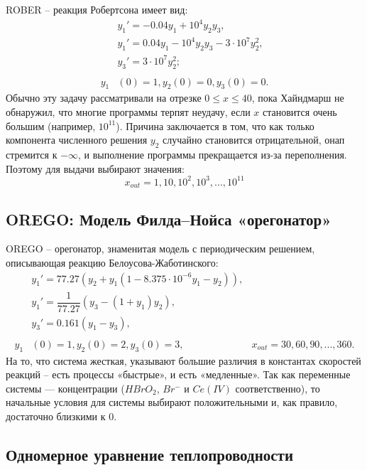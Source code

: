 \documentclass[a4paper,14pt]{extreport}
\begin{document}
  ROBER -- реакция Робертсона имеет вид:
   \begin{equation}
	\begin{aligned}
	\label{rober}
	&y_1' = -0.04y_1+10^4 y_2y_3,\\
	&y_1' = 0.04y_1-10^4y_2y_3 -3 \cdot 10^7y_2^2,\\
	&y_3' = 3\cdot10^7y_2^2;\\
	\\
	y_1&(0)=1, y_2(0) = 0, y_3(0) = 0.
	\end{aligned}
	\end{equation}
Обычно эту задачу рассматривали на отрезке $0 \leq x \leq 40$, пока Хайндмарш не обнаружил, что многие программы терпят неудачу, если $x$ становится очень большим (например, $10^11$). Причина заключается в том, что как только компонента численного решения $y_2$ случайно становится отрицательной, онап стремится к $-\infty$, и выполнение программы прекращается из-за переполнения. Поэтому для выдачи выбирают значения:
$$ x_{out}=1, 10, 10^2, 10^3, ..., 10^{11}$$


\subsection{OREGO: Модель Филда–Нойса «орегонатор»}
  \label{ss:orego}
OREGO -- орегонатор, знаменитая модель с периодическим решением, описывающая реакцию Белоусова-Жаботинского:
\begin{equation}
	\begin{aligned}
	\label{orego}
	&y_1' = 77.27(y_2+y_1(1-8.375\cdot10^{-6}y_1-y_2)),\\
	&y_1' = \dfrac{1}{77.27}(y_3-(1+y_1)y_2),\\
	&y_3' = 0.161(y_1-y_3),\\
	\\
	y_1&(0)=1, y_2(0) = 2, y_3(0) = 3, & x_{out}=30, 60, 90, ..., 360.
	\end{aligned}
	\end{equation}
	На то, что система жесткая, указывают большие различия в константах скоростей реакций -- есть процессы «быстрые», и есть «медленные».
Так как переменные системы — концентрации ($HBrO_2$, $Br^{-}$ и $Ce(IV)$ соответственно), то начальные условия для системы  выбирают положительными и, как правило, достаточно близкими к $0$.


\subsection{Одномерное уравнение теплопроводности}
  \label{ss:teploprov}
  
\end{document}
